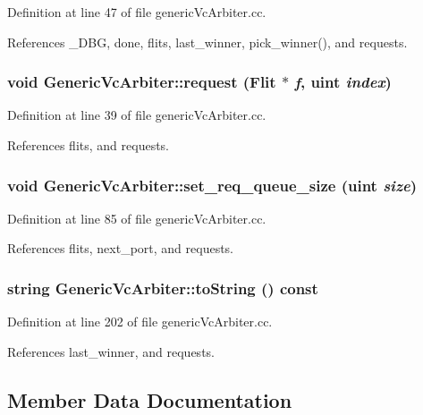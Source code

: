 Definition at line 47 of file genericVcArbiter.cc.

References \_\-DBG, done, flits, last\_\-winner, pick\_\-winner(), and requests.
\subsubsection[{request}]{\setlength{\rightskip}{0pt plus 5cm}void GenericVcArbiter::request ({\bf Flit} $\ast$ {\em f}, \/  {\bf uint} {\em index})}\label{classGenericVcArbiter_c118c1a5cc6a9d105cd6ac5c54c7fe77}




Definition at line 39 of file genericVcArbiter.cc.

References flits, and requests.
\subsubsection[{set\_\-req\_\-queue\_\-size}]{\setlength{\rightskip}{0pt plus 5cm}void GenericVcArbiter::set\_\-req\_\-queue\_\-size ({\bf uint} {\em size})}\label{classGenericVcArbiter_9424efde9588993e6b7315bd8e536ee9}




Definition at line 85 of file genericVcArbiter.cc.

References flits, next\_\-port, and requests.
\subsubsection[{toString}]{\setlength{\rightskip}{0pt plus 5cm}string GenericVcArbiter::toString () const}\label{classGenericVcArbiter_b2b98c13d7e7c13e703845591f241e70}




Definition at line 202 of file genericVcArbiter.cc.

References last\_\-winner, and requests.

\subsection{Member Data Documentation}
